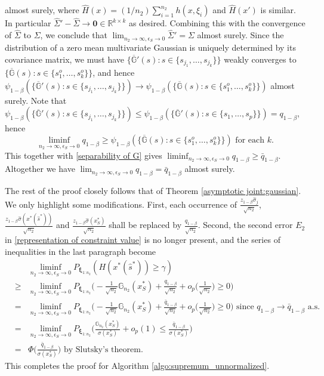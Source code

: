 \documentclass[mnsc,blindrev]{informs4} %
\newcommand{\R}{\mathbb{R}}
\begin{document}
almost surely, where $\hat H(x)=(1/n_2)\sum_{i=1}^{n_2}h(x,\xi_i)$ and $\hat H(x')$ is similar. In particular $\hat \Sigma'-\hat \Sigma\to \mathbf{0}\in \R^{k\times k}$ as desired. Combining this with the convergence of $\hat \Sigma$ to $\Sigma$, we conclude that $\lim_{n_2\to\infty,\epsilon_S\to 0}\hat \Sigma'= \Sigma$ almost surely. Since the distribution of a zero mean multivariate Gaussian is uniquely determined by its covariance matrix, we must have $\{\overline{\mathbb G}'(s):s\in\{s_{j_1},\ldots,s_{j_k}\}\}$ weakly converges to $\{\overline{\mathbb G}(s):s\in\{s^o_1,\ldots,s^o_k\}\}$, and hence $\psi_{1-\beta}(\{\overline{\mathbb G}'(s):s\in\{s_{j_1},\ldots,s_{j_k}\}\})\to \psi_{1-\beta}(\{\overline{\mathbb G}(s):s\in\{s^o_1,\ldots,s^o_k\}\})$ almost surely. Note that $\psi_{1-\beta}(\{\overline{\mathbb G}'(s):s\in\{s_{j_1},\ldots,s_{j_k}\}\})\leq \psi_{1-\beta}(\{\overline{\mathbb G}'(s):s\in\{s_1,\ldots,s_p\}\})=q_{1-\beta}$, hence
\begin{equation*}
    \liminf_{n_2\to\infty,\epsilon_S\to 0}q_{1-\beta}\geq \psi_{1-\beta}(\{\overline{\mathbb G}(s):s\in\{s^o_1,\ldots,s^o_k\}\})\text{ for each }k.
\end{equation*}
This together with \eqref{separability of G} gives $\liminf_{n_2\to\infty,\epsilon_S\to 0}q_{1-\beta}\geq \bar{q}_{1-\beta}$. Altogether we have $\lim_{n_2\to\infty,\epsilon_S\to 0}q_{1-\beta}=\bar{q}_{1-\beta}$ almost surely.

The rest of the proof closely follows that of Theorem \ref{asymptotic joint:gaussian}. We only highlight some modifications. First, each occurrence of $\frac{z_{1-\beta}\hat\sigma_j}{\sqrt{n_2}}$, $\frac{z_{1-\beta}\hat\sigma(x^*(\hat s^*))}{\sqrt{n_2}}$ and $\frac{z_{1-\beta}\hat\sigma(x^*_S)}{\sqrt{n_2}}$ shall be replaced by $\frac{q_{1-\beta}}{\sqrt{n_2}}$. Second, the second error $E_2$ in \eqref{representation of constraint value} is no longer present, and the series of inequalities in the last paragraph become
\begin{eqnarray*}
&&\liminf_{n_2\to\infty,\epsilon_S\to 0}P_{\bm{\xi}_{1:n_2}}(H(x^*(\hat s^*))\geq \gamma)\\
&\geq &\liminf_{n_2\to\infty,\epsilon_S\to 0}P_{\bm{\xi}_{1:n_2}}\Big(-\frac{1}{\sqrt{n_2}}\mathbb G_{n_2}(x_S^*)+\frac{q_{1-\beta}}{\sqrt{n_2}}+o_p\big(\frac{1}{\sqrt{n_2}}\big)\geq 0\Big)\\
&=&\liminf_{n_2\to\infty,\epsilon_S\to 0}P_{\bm{\xi}_{1:n_2}}\Big(-\frac{1}{\sqrt{n_2}}\mathbb G_{n_2}(x_S^*)+\frac{\bar{q}_{1-\beta}}{\sqrt{n_2}}+o_p\big(\frac{1}{\sqrt{n_2}}\big)\geq 0\Big)\text{\ \ since }q_{1-\beta}\to \bar{q}_{1-\beta}\text{ a.s.}\\
&= &\liminf_{n_2\to\infty,\epsilon_S\to 0}P_{\bm{\xi}_{1:n_2}}\Big(\frac{\mathbb G_{n_2}(x_S^*)}{\sigma (x_S^*)}+o_p(1)\leq \frac{\bar{q}_{1-\beta}}{\sigma (x_S^*)}\Big)\\
&=&\Phi\big(\frac{\bar{q}_{1-\beta}}{\sigma (x_S^*)}\big)\text{\ \ by Slutsky's theorem}.
\end{eqnarray*}
This completes the proof for Algorithm \ref{algo:supremum_unnormalized}.
\end{document}
